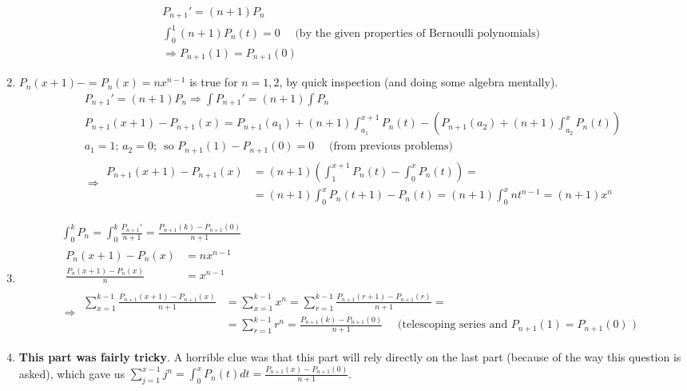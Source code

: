 \documentclass[twoside]{amsart}
\theoremstyle{plain}
\theoremstyle{definition}
\begin{document}
\begin{enumerate}
\[\begin{gathered}
  P_{n+1}' = (n+1) P_n \\
  \int_0^1 (n+1) P_n(t) = 0 \quad \text{ (by the given properties of Bernoulli polynomials) } \\
  \Longrightarrow P_{n+1}(1)  = P_{n+1}(0)
\end{gathered}
\] 
\item $P_n(x+1)-= P_n(x) = nx^{n-1}$ is true for $n=1,2$, by quick inspection (and doing some algebra mentally).  
\[
\begin{gathered}
  P_{n+1}' = (n+1) P_n \Longrightarrow \int P_{n+1}' = (n+1) \int P_n \\
  P_{n+1}(x+1) - P_{n+1}(x) = P_{n+1}(a_1) + (n+1)\int_{a_1}^{x+1} P_n(t) - ( P_{n+1}(a_2) + (n+1)\int_{a_2}^x P_n(t) ) \\
  a_1 = 1; \, a_2 =0; \, \text{ so } P_{n+1}(1) - P_{n+1}(0) = 0 \quad \text{ (from previous problems) } \\
  \Longrightarrow 
\begin{aligned} P_{n+1}(x+1) - P_{n+1}(x) & = (n+1) ( \int_1^{x+1} P_n(t) - \int_0^x P_n(t) ) = \\ 
  & = (n+1) \int_0^x P_n(t+1) - P_n(t) = (n+1) \int_0^x nt^{n-1} = (n+1)x^n 
\end{aligned}
\end{gathered}
\]
\item \[
\begin{gathered}
  \int_0^k P_n = \int_0^k \frac{P_{n+1}'}{ n+1} = \frac{ P_{n+1}(k) - P_{n+1}(0) }{ n+1} \\
  \begin{aligned}
    P_n(x+1) - P_n(x) & = nx^{n-1} \\
    \frac{ P_n(x+1) - P_n(x) }{ n} & = x^{n-1}
  \end{aligned}  \\ 
  \Longrightarrow 
  \begin{aligned} 
    \sum_{x=1}^{k-1} \frac{ P_{n+1}(x+1) - P_{n+1}(x) }{ n +1 } & = \sum_{x=1}^{k-1} x^n  = \sum_{r=1}^{k-1} \frac{ P_{n+1}(r+1) - P_{n+1}(r) }{ n+1} = \\ 
    & = \sum_{r=1}^{k-1} r^n  = \frac{ P_{n+1}(k) - P_{n+1}(0) }{ n+1} \quad \text{ (telescoping series and $P_{n+1}(1) = P_{n+1}(0)$ ) }
\end{aligned}
\end{gathered}
\] 
\item \textbf{This part was fairly tricky}.  A horrible clue was that this part will rely directly on the last part (because of the way this question is asked), which gave us $\sum_{j=1}^{x-1} j^n = \int_0^x P_n(t) dt = \frac{ P_{n+1}(x) - P_{n+1}(0)}{ n+1}$.  


\end{enumerate}
\end{document}
